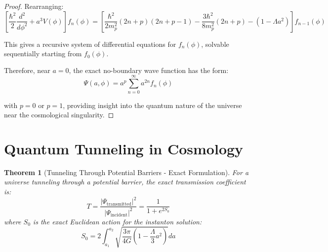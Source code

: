 \documentclass{article}
\newtheorem{theorem}{Theorem}
\begin{document}
\begin{proof}
Rearranging:
\begin{equation}
\left[\frac{\hbar^2}{2}\frac{d^2}{d\phi^2} + a^3V(\phi)\right]f_n(\phi) = \left[\frac{\hbar^2}{2m_p^2}(2n+p)(2n+p-1) - \frac{3\hbar^2}{8m_p^2}(2n+p) - (1-\Lambda a^2)\right]f_{n-1}(\phi)
\end{equation}

This gives a recursive system of differential equations for $f_n(\phi)$, solvable sequentially starting from $f_0(\phi)$.

Therefore, near $a=0$, the exact no-boundary wave function has the form:
\begin{equation}
\Psi(a,\phi) = a^p\sum_{n=0}^{\infty}a^{2n}f_n(\phi)
\end{equation}

with $p=0$ or $p=1$, providing insight into the quantum nature of the universe near the cosmological singularity.
\end{proof}

\section{Quantum Tunneling in Cosmology}

\begin{theorem}[Tunneling Through Potential Barriers - Exact Formulation]
  For a universe tunneling through a potential barrier, the exact transmission
  coefficient is:
  \begin{equation}
    T = \frac{| \Psi_{\text{transmitted}}|^2}{| \Psi_{\text{incident}}|^2} =
    \frac{1}{1 + e^{2 S_0}}
  \end{equation}
  where $S_0$ is the exact Euclidean action for the instanton solution:
  \begin{equation}
    S_0 = 2 \int_{a_1}^{a_2}  \sqrt{\frac{3 \pi}{4 G}  \left( 1 -
    \frac{\Lambda}{3} a^2 \right)} da
  \end{equation}
\end{theorem}
\end{document}
